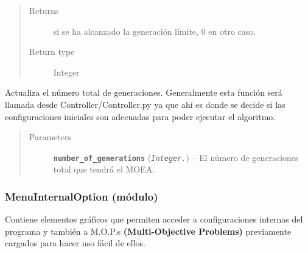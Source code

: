 \documentclass[letterpaper,10pt,english]{sphinxmanual}
\begin{document}
\begin{fulllineitems}
\begin{fulllineitems}
\begin{quote}
\begin{description}
\item[{Returns}]  si se  ha alcanzado la generación límite, 0 en otro caso.

\item[{Return type}] \leavevmode
Integer

\end{description}\end{quote}

\end{fulllineitems}


\begin{fulllineitems}
\label{View/Additional/GenerationSignal/GenerationSignal:View.Additional.GenerationSignal.GenerationSignalToplevel.GenerationSignalToplevel.update_number_of_generations}
Actualiza el número total de generaciones. Generalmente esta función
será llamada desde Controller/Controller.py ya que ahí es donde se decide
si las configuraciones iniciales son adecuadas para poder ejecutar el algoritmo.
\begin{quote}\begin{description}
\item[{Parameters}] \leavevmode
\textbf{\texttt{number\_of\_generations}} (\emph{\texttt{Integer.}}) -- El número de generaciones total que tendrá el MOEA.

\end{description}\end{quote}

\end{fulllineitems}


\end{fulllineitems}



\subsubsection{MenuInternalOption (módulo)}
\label{View/Additional/MenuInternalOption/MenuInternalOption:menuinternaloption-modulo}\label{View/Additional/MenuInternalOption/MenuInternalOption::doc}
Contiene elementos gráficos que permiten acceder a configuraciones internas del
programa y también a M.O.P.s \textbf{(Multi-Objective Problems)} previamente cargados
para hacer uso fácil de ellos.
\label{View/Additional/MenuInternalOption/MenuInternalOption:module-View.Additional.MenuInternalOption.MenuInternalOption}
\end{document}
